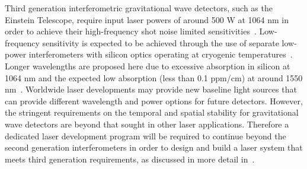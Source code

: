 \documentclass{article}
\begin{document}
Third generation interferometric gravitational wave detectors, such as the
Einstein Telescope, require input laser powers of around 500 W at 1064 nm in
order to achieve their high-frequency shot noise limited
sensitivities~\cite{Hild:2010}.  Low-frequency sensitivity is expected to be
achieved through the use of separate low-power interferometers with silicon
optics operating at cryogenic temperatures~\cite{Rowan:2003, Punturo:2010}.
Longer wavelengths are proposed here due to excessive absorption in silicon at
1064 nm and the expected low absorption (less than 0.1 ppm/cm) at around 1550
nm~\cite{Green:1995}. Worldwide laser developments may provide new baseline
light sources that can provide different wavelength and power options for future
detectors. However, the stringent requirements on the temporal and spatial
stability for gravitational wave detectors are beyond that sought in other
laser applications. Therefore a dedicated laser development program will be
required to continue beyond the second generation interferometers in order to
design and build a laser system that meets third generation requirements, as
discussed in more detail in~\cite{Mavalvala:2010}.


%
%
\end{document}
